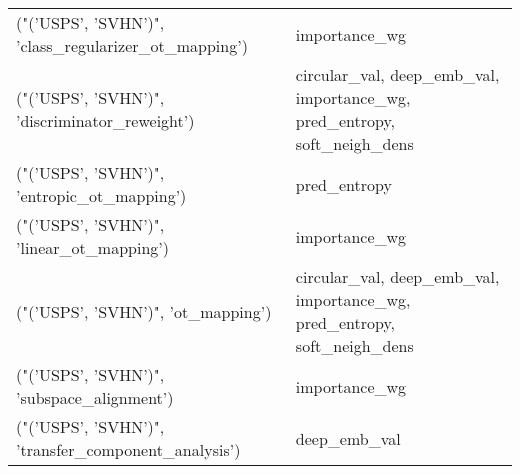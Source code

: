 \begin{tabular}{ll}
 ("('USPS', 'SVHN')", 'class\_regularizer\_ot\_mapping')  & importance\_wg                                                            \\
 ("('USPS', 'SVHN')", 'discriminator\_reweight')        & circular\_val, deep\_emb\_val, importance\_wg, pred\_entropy, soft\_neigh\_dens \\
 ("('USPS', 'SVHN')", 'entropic\_ot\_mapping')           & pred\_entropy                                                             \\
 ("('USPS', 'SVHN')", 'linear\_ot\_mapping')             & importance\_wg                                                            \\
 ("('USPS', 'SVHN')", 'ot\_mapping')                    & circular\_val, deep\_emb\_val, importance\_wg, pred\_entropy, soft\_neigh\_dens \\
 ("('USPS', 'SVHN')", 'subspace\_alignment')            & importance\_wg                                                            \\
 ("('USPS', 'SVHN')", 'transfer\_component\_analysis')   & deep\_emb\_val                                                             \\
\hline
\end{tabular}